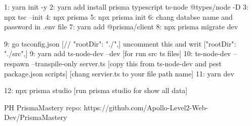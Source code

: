 1: yarn init -y
2: yarn add install prisma typescript ts-node @types/node -D
3: npx tsc --init
4: npx prisma
5: npx prisma init
6: chang databse name and password in .env file 
7: yarn add @prisma/client
8: npx prisma migrate dev

9: go tsconfig.json [// "rootDir": "./",] uncomment this and writ ["rootDir": "./src",]
9: yarn add ts-node-dev --dev [for run src ts files]
10: ts-node-dev --respawn --transpile-only server.ts [copy this from ts-node-dev and pest package.json scripts] [chang servier.ts to your file path name]
11: yarn dev


12: npx prisma studio [run prisma studio for show all data]



PH PrismaMastery repo: https://github.com/Apollo-Level2-Web-Dev/PrismaMastery
